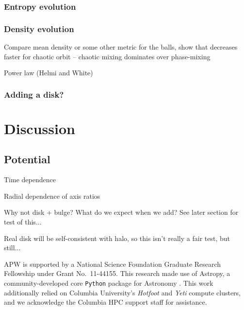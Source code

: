 \documentclass[letterpaper,12pt,preprint]{aastex}
\begin{document}
\subsubsection{Entropy evolution}

\subsubsection{Density evolution}

Compare mean density or some other metric for the balls, show that decreases faster for chaotic orbit -- chaotic mixing dominates over phase-mixing

Power law (Helmi and White)

\subsubsection{Adding a disk?}

\section{Discussion}\label{sec:discussion}

\subsection{Potential}

Time dependence

Radial dependence of axis ratios

Why not disk + bulge? What do we expect when we add? See later section for test of this...

Real disk will be self-consistent with halo, so this isn't really a fair test, but still...

\acknowledgements
APW is supported by a National Science Foundation Graduate Research Fellowship under Grant No.\ 11-44155. 
This research made use of Astropy, a community-developed core \texttt{Python} package for Astronomy \citep{astropy13}.
This work additionally relied on Columbia University's \emph{Hotfoot} and \emph{Yeti} compute clusters, and we acknowledge the Columbia HPC support staff for assistance. \\



\end{document}
